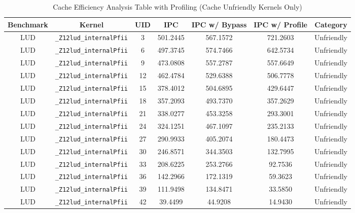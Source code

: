 \documentclass{article}
\begin{document}
\begin{table}[H]
\small
\caption{Cache Efficiency Analysis Table with Profiling (Cache Unfriendly Kernels Only)} %
\centering %
\begin{tabular}{c c c c c c c} %
\hline\hline %
Benchmark & Kernel & UID & IPC & IPC w/ Bypass & IPC w/ Profile & Category \\ [0.5ex] %
\hline %
LUD & \verb|_Z12lud_internalPfii|                    & 3  & 501.2445  & 567.1572 &  721.2603 & Unfriendly\\
LUD & \verb|_Z12lud_internalPfii|                    & 6  & 497.3745  & 574.7466 &  642.5734 & Unfriendly\\
LUD & \verb|_Z12lud_internalPfii|                    & 9  & 473.0808  & 557.2787 &  557.6649 & Unfriendly\\
LUD & \verb|_Z12lud_internalPfii|                    & 12 & 462.4784  & 529.6388 &  506.7778 & Unfriendly\\
LUD & \verb|_Z12lud_internalPfii|                    & 15 & 378.4012  & 504.6895 &  429.6447 & Unfriendly\\
LUD & \verb|_Z12lud_internalPfii|                    & 18 & 357.2093  & 493.7370 &  357.2629 & Unfriendly\\
LUD & \verb|_Z12lud_internalPfii|                    & 21 & 338.0277  & 453.3258 &  293.3001 & Unfriendly\\
LUD & \verb|_Z12lud_internalPfii|                    & 24 & 324.1251  & 467.1097 &  235.2133 & Unfriendly\\
LUD & \verb|_Z12lud_internalPfii|                    & 27 & 290.9933  & 405.2074 &  180.4473 & Unfriendly\\
LUD & \verb|_Z12lud_internalPfii|                    & 30 & 246.8571  & 344.3503 &  132.7995 & Unfriendly\\
LUD & \verb|_Z12lud_internalPfii|                    & 33 & 208.6225  & 253.2766 &   92.7536 & Unfriendly\\
LUD & \verb|_Z12lud_internalPfii|                    & 36 & 142.2966  & 172.1319 &   59.3623 & Unfriendly\\
LUD & \verb|_Z12lud_internalPfii|                    & 39 & 111.9498  & 134.8471 &   33.5850 & Unfriendly\\
LUD & \verb|_Z12lud_internalPfii|                    & 42 & 39.4499   & 44.9208  &   14.9430 & Unfriendly\\

\end{tabular}
\end{table}
\end{document}
